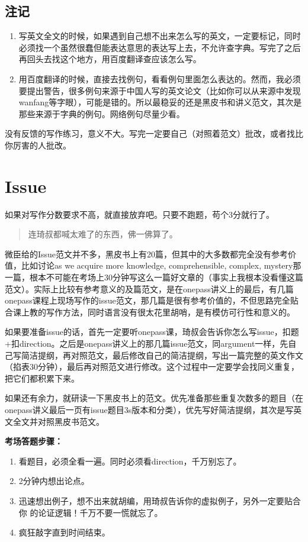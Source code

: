 \documentclass[cn,plain]{elegantbookex}
\begin{document}
\subsection{注记}
\begin{enumerate}
    \item 写英文全文的时候，如果遇到自己想不出来怎么写的英文，一定要标记，同时必须找一个虽然很蠢但能表达意思的表达写上去，不允许查字典。写完了之后再回头去找这个地方，用百度翻译查应该怎么写。
    \item 用百度翻译的时候，直接去找例句，看看例句里面怎么表达的。然而，我必须要提出警告，很多例句来源于中国人写的英文论文（比如你可以从来源中发现wanfang等字眼），可能是错的。所以最稳妥的还是黑皮书和讲义范文，其次是那些来源于字典的例句。网络例句尽量少看。
\end{enumerate}

没有反馈的写作练习，意义不大。写完一定要自己（对照着范文）批改，或者找比你厉害的人批改。

\section{Issue}
如果对写作分数要求不高，就直接放弃吧。只要不跑题，苟个3分就行了。

\begin{quote}
连琦叔都喊太难了的东西，佛一佛算了。
\end{quote}

微臣给的Issue范文并不多，黑皮书上有20篇，但其中的大多数都完全没有参考价值，比如讨论as
we acquire more knowledge, comprehensible, complex,
mystery那一篇，根本不可能在考场上30分钟写这么一篇好文章的（事实上我根本没看懂这篇范文）。实际上比较有参考意义的及篇范文，是在onepass讲义上的最后，有几篇onepass课程上现场写作的issue范文，那几篇是很有参考价值的，不但思路完全贴合课上教的写作方法，同时语言没有很太花里胡哨，是有模仿可行性和意义的。

如果要准备issue的话，首先一定要听onepass课，琦叔会告诉你怎么写issue，扣题+扣direction。之后是onepass讲义上的那几篇issue范文，同argument一样，先自己写简洁提纲，再对照范文，最后修改自己的简洁提纲，写出一篇完整的英文作文（掐表30分钟），最后再对照范文进行修改。这个过程中一定要学会找同义重复，把它们都积累下来。

如果还有余力，就研读一下黑皮书上的范文。优先准备那些重复次数多的题目（在onepass讲义最后一页有issue题目3s版本和分类），优先写好简洁提纲，其次是写英文全文并对照黑皮书范文。

\textbf{考场答题步骤：}
\begin{enumerate}
\item 看题目，必须全看一遍。同时必须看direction，千万别忘了。
\item 2分钟内想出论点。
\item 迅速想出例子，想不出来就胡编，用琦叔告诉你的虚拟例子，另外一定要贴合你
的论证逻辑！千万不要一慌就忘了。
\item 疯狂敲字直到时间结束。
\end{enumerate}
\end{document}

